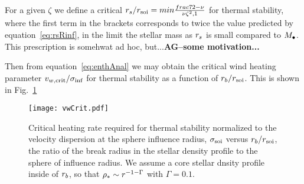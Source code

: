 For a given $\zeta$ we define a critical $r_s/r_{\rm soi}=min{
  \frac{frac{7}{2}-\nu}{\nu \zeta^2, 1}}$ for thermal stability, 
where the first term in the brackets corresponds to twice the value
predicted by equation~\eqref{eq:rsRinf}, in the limit the stellar mass
as $r_s$ is small compared to $M_{\bullet}$. This prescription is somehwat
ad hoc, but...{\bf AG--some motivation...}

Then from equation~\eqref{eq:enthAnal} we may obtain the critical
wind heating parameter $v_{w, \rm crit}/\sigma_{\rm inf}$ for thermal stability as
a function of $r_b/r_{\rm soi}$. This is shown in Fig.~\ref{fig:vwCrit}

\begin{figure}
\texttt{[image: vwCrit.pdf]}
\caption{\label{fig:vwCrit} Critical heating rate required for thermal
  stability normalized to the velocity dispersion at the sphere
  influence radius, $\sigma_{\rm soi}$ versus $r_b/r_{\rm soi}$, the ratio
  of the break radius in the stellar density profile to the sphere of
  influence radius. We assume a core stellar dnsity profile inside of
  $r_b$, so that $\rho_*\sim r^{-1-\Gamma}$ with $\Gamma=0.1$.}
\end{figure}


